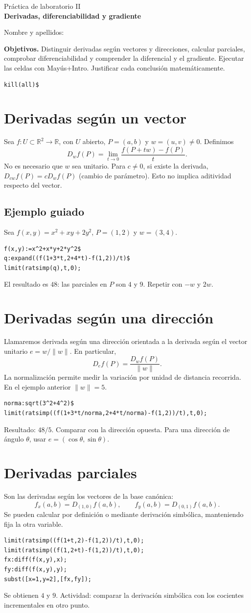 \documentclass[12pt,a4paper]{article}
\begin{document}
\begin{center}{\large Práctica de laboratorio II}\\[5pt]{\LARGE\bfseries\color{azul} Derivadas, diferenciabilidad y gradiente}\end{center}
\noindent Nombre y apellidos: \hrulefill\par\medskip
\noindent\textbf{Objetivos.} Distinguir derivadas según vectores y direcciones, calcular parciales, comprobar diferenciabilidad y comprender la diferencial y el gradiente. Ejecutar las celdas con Mayús+Intro. Justificar cada conclusión matemáticamente.
\begin{lstlisting}
kill(all)$
\end{lstlisting}
\section{Derivadas según un vector}
Sea $f:U\subset\mathbb R^2\to\mathbb R$, con $U$ abierto, $P=(a,b)$ y $w=(u,v)\ne0$. Definimos
\[D_wf(P)=\lim_{t\to0}\frac{f(P+tw)-f(P)}{t}.\]
No es necesario que $w$ sea unitario. Para $c\ne0$, si existe la derivada, $D_{cw}f(P)=cD_wf(P)$ (cambio de parámetro). Esto no implica aditividad respecto del vector.
\subsection*{Ejemplo guiado} Sea $f(x,y)=x^2+xy+2y^2$, $P=(1,2)$ y $w=(3,4)$.
\begin{lstlisting}
f(x,y):=x^2+x*y+2*y^2$
q:expand((f(1+3*t,2+4*t)-f(1,2))/t)$
limit(ratsimp(q),t,0);
\end{lstlisting}
El resultado es $\boxed{48}$: las parciales en $P$ son $4$ y $9$. Repetir con $-w$ y $2w$.
\section{Derivadas según una dirección}
Llamaremos derivada según una dirección orientada a la derivada según el vector unitario $e=w/\|w\|$. En particular,
\[\boxed{D_ef(P)=\frac{D_wf(P)}{\|w\|}}.\]
La normalización permite medir la variación por unidad de distancia recorrida. En el ejemplo anterior $\|w\|=5$.
\begin{lstlisting}
norma:sqrt(3^2+4^2)$
limit(ratsimp((f(1+3*t/norma,2+4*t/norma)-f(1,2))/t),t,0);
\end{lstlisting}
Resultado: $48/5$. Comparar con la dirección opuesta. Para una dirección de ángulo $\theta$, usar $e=(\cos\theta,\sin\theta)$.
\section{Derivadas parciales}
Son las derivadas según los vectores de la base canónica:
\[f_x(a,b)=D_{(1,0)}f(a,b),\qquad f_y(a,b)=D_{(0,1)}f(a,b).\]
Se pueden calcular por definición o mediante derivación simbólica, manteniendo fija la otra variable.
\begin{lstlisting}
limit(ratsimp((f(1+t,2)-f(1,2))/t),t,0);
limit(ratsimp((f(1,2+t)-f(1,2))/t),t,0);
fx:diff(f(x,y),x);
fy:diff(f(x,y),y);
subst([x=1,y=2],[fx,fy]);
\end{lstlisting}
Se obtienen $4$ y $9$. Actividad: comparar la derivación simbólica con los cocientes incrementales en otro punto.
\end{document}
